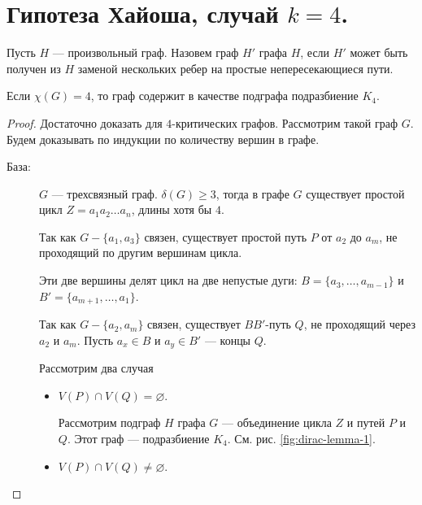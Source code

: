 \section{Гипотеза Хайоша, случай $k = 4$.}
\begin{definition}
    Пусть $H$ --- произвольный граф. Назовем граф $H'$  графа $H$, если $H'$ может быть получен из $H$ заменой нескольких ребер на простые непересекающиеся пути.
\end{definition}
\begin{theorem}[Дирак, 1953]
    Если $\chi(G) = 4$, то граф содержит в качестве подграфа подразбиение $K_4$.
\end{theorem}
\begin{proof}
    Достаточно доказать для $4$-критических графов. Рассмотрим такой граф $G$. Будем доказывать по индукции по количеству вершин в графе.

	\begin{description}
		\item[База:] $G$ --- трехсвязный граф. $\delta(G) \ge 3$, тогда в графе $G$ существует простой цикл $Z = a_1a_2\ldots a_n$, длины хотя бы $4$.

			Так как $G - \{a_1, a_3\}$ связен, существует простой путь $P$ от $a_2$ до $a_m$, не проходящий по другим вершинам цикла.

			Эти две вершины делят цикл на две непустые дуги: $B = \{a_3, \ldots , a_{m-1}\}$ и $B' = \{a_{m+1}, \ldots , a_1\}$.

			Так как $G - \{a_2, a_m\}$ связен, существует $BB'$-путь $Q$, не проходящий через $a_2$ и $a_m$. Пусть $a_x \in B$ и $a_y \in B'$ --- концы $Q$.

			Рассмотрим два случая
			\begin{itemize}
				\item $V(P) \cap V(Q) = \varnothing$.

					Рассмотрим подграф $H$ графа $G$ --- объединение цикла $Z$ и путей $P$ и $Q$. Этот граф --- подразбиение $K_4$.  См. рис. \ref{fig:dirac-lemma-1}.
				\item $V(P) \cap V(Q) \neq \varnothing$.


\end{itemize}
\end{description}
\end{proof}
